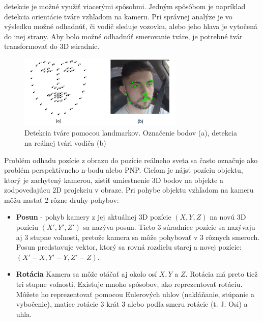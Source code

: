 \documentclass[slovak,master,dept460,male,cpp,cpdeclaration]{diploma}
\begin{document}
detekcie je možné využiť viacerými spôsobmi. Jedným spôsôbom je napríklad detekcia orientácie tváre vzhľadom na kameru. Pri správnej analýze je vo výsledku možné odhadnúť, či vodič sleduje vozovku, alebo jeho hlava je vytočená do inej strany. Aby bolo možné odhadnúť smerovanie tváre, je potrebné tvár transformovať do 3D súradníc.

\begin{figure}[H]
	\centering
	\includegraphics[width=0.7\textwidth]{Figures/landmarks.png}
	\caption{Detekcia tváre pomocou landmarkov. Označenie  bodov (a), detekcia na reálnej tvári vodiča (b)}
	\label{fig:landmarks}
\end{figure}


Problém odhadu pozície z obrazu do pozície reálneho sveta sa často označuje ako problém perspektívneho n-bodu alebo PNP. Cieľom je nájsť pozíciu objektu, ktorý je zachytený kamerou, zistiť umiestnenie  3D bodov na objekte a zodpovedajúcu 2D projekciu v obraze. Pri pohybe objektu vzhľadom na kameru môžu nastať 2 rôzne druhy pohybov:
\begin{itemize}
\item\textbf{Posun} - pohyb kamery z jej aktuálnej 3D pozície $(X, Y, Z)$ na novú 3D pozíciu $(X ', Y', Z ')$ sa nazýva posun. Tieto 3 súradnice pozície sa nazývaju aj 3 stupne voľnosti, pretože kamera sa môže pohybovať v 3 rôznych smeroch. Posun predstavuje vektor, ktorý sa rovná rozdielu starej a novej pozície:  $(X '- X, Y' - Y, Z '- Z)$.
\item\textbf{Rotácia}  Kamera sa môže otáčať aj okolo osí $X, Y$ a $Z$. Rotácia má preto tiež tri stupne voľnosti. Existuje mnoho spôsobov, ako reprezentovať rotáciu. Môžete ho reprezentovať pomocou Eulerových uhlov (nakláňanie, stúpanie a vybočenie), matice rotácie 3 krát 3 alebo podľa smeru rotácie (t. J. Osi) a uhla.
\end{itemize}
\end{document}

